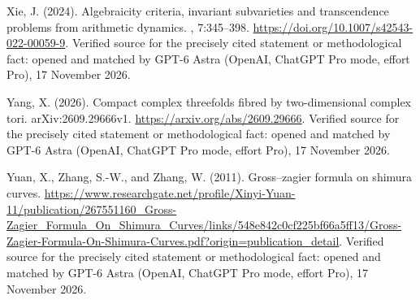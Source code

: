 \begin{thebibliography}{}
Xie, J. (2024).
\newblock Algebraicity criteria, invariant subvarieties and transcendence
  problems from arithmetic dynamics.
, 7:345--398.
\newblock \url{https://doi.org/10.1007/s42543-022-00059-9}. Verified source for the precisely cited statement or methodological fact: opened and matched by GPT-6 Astra (OpenAI, ChatGPT Pro mode, effort Pro), 17 November 2026.

Yang, X. (2026).
\newblock Compact complex threefolds fibred by two-dimensional complex tori.
\newblock arXiv:2609.29666v1.
\newblock \url{https://arxiv.org/abs/2609.29666}. Verified source for the precisely cited statement or methodological fact: opened and matched by GPT-6 Astra (OpenAI, ChatGPT Pro mode, effort Pro), 17 November 2026.

Yuan, X., Zhang, S.-W., and Zhang, W. (2011).
\newblock Gross--zagier formula on shimura curves.
\newblock \url{https://www.researchgate.net/profile/Xinyi-Yuan-11/publication/267551160_Gross-Zagier_Formula_On_Shimura_Curves/links/548e842c0cf225bf66a5ff13/Gross-Zagier-Formula-On-Shimura-Curves.pdf?origin=publication_detail}. Verified source for the precisely cited statement or methodological fact: opened and matched by GPT-6 Astra (OpenAI, ChatGPT Pro mode, effort Pro), 17 November 2026.

\end{thebibliography}
